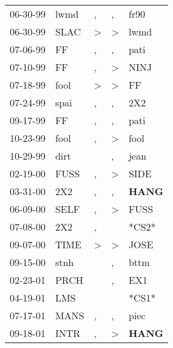 \begin{supertabular}{p{0.07\textwidth}p{0.06\textwidth}p{0.02\textwidth}p{0.02\textwidth}p{0.06\textwidth}}
 06-30-99\textsuperscript{} &  lwmd\textsuperscript{} &             , &             , &           fr90\textsuperscript{} \\
 06-30-99\textsuperscript{} &  SLAC\textsuperscript{} &  \textgreater &  \textgreater &           lwmd\textsuperscript{} \\
 07-06-99\textsuperscript{} &    FF\textsuperscript{} &             , &             , &           pati\textsuperscript{} \\
 07-10-99\textsuperscript{} &    FF\textsuperscript{} &             , &  \textgreater &           NINJ\textsuperscript{} \\
 07-18-99\textsuperscript{} &  fool\textsuperscript{} &  \textgreater &  \textgreater &             FF\textsuperscript{} \\
 07-24-99\textsuperscript{} &  spai\textsuperscript{} &             , &             , &            2X2\textsuperscript{} \\
 09-17-99\textsuperscript{} &    FF\textsuperscript{} &             , &             , &           pati\textsuperscript{} \\
 10-23-99\textsuperscript{} &  fool\textsuperscript{} &             , &  \textgreater &           fool\textsuperscript{} \\
 10-29-99\textsuperscript{} &  dirt\textsuperscript{} &               &             , &           jean\textsuperscript{} \\
 02-19-00\textsuperscript{} &  FUSS\textsuperscript{} &             , &  \textgreater &           SIDE\textsuperscript{} \\
 03-31-00\textsuperscript{} &   2X2\textsuperscript{} &             , &             , &  \textbf{HANG\textsuperscript{}} \\
 06-09-00\textsuperscript{} &  SELF\textsuperscript{} &             , &  \textgreater &           FUSS\textsuperscript{} \\
 07-08-00\textsuperscript{} &   2X2\textsuperscript{} &             , &               &                            *CS2* \\
 09-07-00\textsuperscript{} &  TIME\textsuperscript{} &  \textgreater &  \textgreater &           JOSE\textsuperscript{} \\
 09-15-00\textsuperscript{} &  stnh\textsuperscript{} &               &             , &           bttm\textsuperscript{} \\
 02-23-01\textsuperscript{} &  PRCH\textsuperscript{} &               &             , &            EX1\textsuperscript{} \\
 04-19-01\textsuperscript{} &   LMS\textsuperscript{} &               &               &                            *CS1* \\
 07-17-01\textsuperscript{} &  MANS\textsuperscript{} &             , &             , &           piec\textsuperscript{} \\
 09-18-01\textsuperscript{} &  INTR\textsuperscript{} &             , &  \textgreater &  \textbf{HANG\textsuperscript{}} \\
\end{supertabular}
